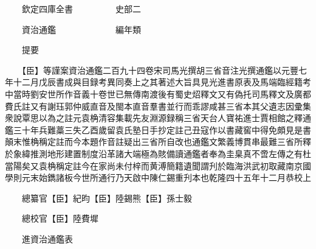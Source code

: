 










 


 
 


 

  
  
  
  
  





  
  
  
  
  
 
  

  

  
  
  



  

 
 

  
   




  

  
  


  　　欽定四庫全書　　　　　史部二

　　資治通鑑　　　　　　　編年類

　　提要

　　【臣】等謹案資治通鑑二百九十四卷宋司馬光撰胡三省音注光撰通鑑以元豐七年十二月戊辰書成與目録考異同奏上之其著述大旨具見光進書原表及馬端臨經籍考中當時劉安世所作音義十卷世已無傳南渡後有蜀史炤釋文又有偽托司馬釋文及廣都費氏註又有謝珏郭仲威直音及閩本直音羣書並行而乖謬咸甚三省本其父遺志因彚集衆說覃思以為之註元袁桷清容集載先友淵源録稱三省天台人寶祐進士賈相館之釋通鑑三十年兵難藁三失乙酉歲留袁氏塾日手抄定註己丑寇作以書藏窖中得免頗見是書顛末惟桷稱定註而今本題作音註疑出三省所自改也通鑑文繁義博貫串最難三省所釋於象緯推測地形建置制度沿革諸大端極為賅備讀通鑑者奉為圭臬真不啻左傳之有杜當陽矣又袁桷稱定註今在家尚未付梓而黄溥簡籍遺聞謂刋於臨海洪武初取藏南京國學則元末始鐫諸板今世所通行乃天啟中陳仁錫重刋本也乾隆四十五年十二月恭校上

　　總纂官【臣】紀昀【臣】陸錫熊【臣】孫士毅

　　總校官【臣】陸費墀

　　進資治通鑑表

